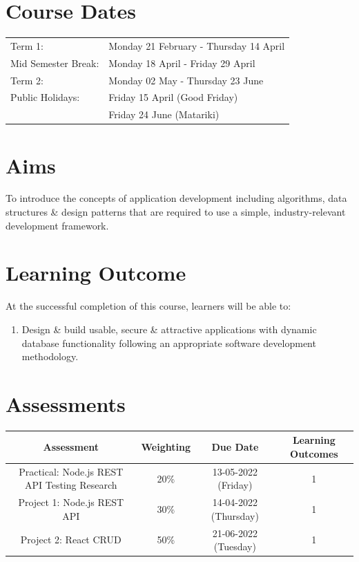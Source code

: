 \documentclass{article}
\begin{document}
\section*{Course Dates}
\begin{tabular}{ll}
	Term 1:             & Monday 21 February - Thursday 14 April \\
	Mid Semester Break: & Monday 18 April - Friday 29 April      \\
	Term 2:             & Monday 02 May - Thursday 23 June       \\
	Public Holidays:    & Friday 15 April (Good Friday)          \\
	                    & Friday 24 June (Matariki)
\end{tabular}

\section*{Aims}
To introduce the concepts of application development including algorithms, data structures \& design patterns that are required to use a simple, industry-relevant development framework.

\section*{Learning Outcome}
At the successful completion of this course, learners will be able to:
\begin{enumerate}
	\item Design \& build usable, secure \& attractive applications with dynamic database functionality following an appropriate software development methodology.
\end{enumerate}

\section*{Assessments}
\renewcommand{\arraystretch}{1.5}
\begin{tabular}{|c|c|c|c|}
	\hline
	\textbf{Assessment}                                 & \textbf{Weighting} & \textbf{Due Date}            & \textbf{Learning Outcomes} \\ \hline
	\small Practical: Node.js REST API Testing Research & \small 20\%        & \small 13-05-2022 (Friday)   & \small 1                   \\ \hline
	\small Project 1: Node.js REST API                  & \small 30\%        & \small 14-04-2022 (Thursday) & \small 1                   \\ \hline
	\small Project 2: React CRUD                        & \small 50\%        & \small 21-06-2022 (Tuesday)  & \small 1                   \\ \hline
\end{tabular}
\end{document}
